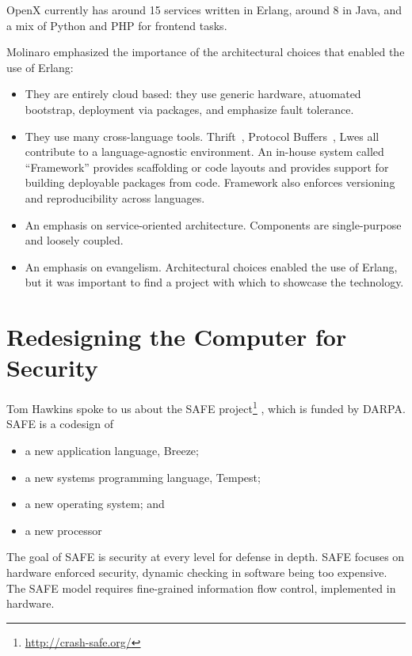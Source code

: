 \documentclass{jfp1}
\begin{document}
OpenX currently has around 15 services written in Erlang, around 8 in
Java, and a mix of Python and PHP for frontend tasks.

Molinaro emphasized the importance of the architectural choices that
enabled the use of Erlang:

\begin{itemize}

\item They are entirely cloud based: they use generic hardware,
atuomated bootstrap, deployment via packages, and emphasize fault
tolerance.

\item They use many cross-language tools. Thrift~\cite{Slee:Thrift},
Protocol Buffers~\cite{Google:2014:Protobufs}, Lwes all
contribute to a language-agnostic environment. An in-house system
called ``Framework'' provides scaffolding or code layouts and provides
support for building deployable packages from code. Framework also
enforces versioning and reproducibility across languages.

\item An emphasis on service-oriented architecture. Components are
single-purpose and loosely coupled.

\item An emphasis on evangelism. Architectural choices enabled the use
of Erlang, but it was important to find a project with which to
showcase the technology.

\end{itemize}

\section{Redesigning the Computer for Security}


Tom Hawkins spoke to us about the SAFE
project\footnote{\url{http://crash-safe.org/}} , which is funded by
DARPA. SAFE is a codesign of

\begin{itemize}
\item a new application language, Breeze;
\item a new systems programming language, Tempest;
\item a new operating system; and
\item a new processor 
\end{itemize}

The goal of SAFE is security at every level for defense in depth.
SAFE focuses on hardware enforced security, dynamic checking
in software being too expensive. The SAFE model requires fine-grained
information flow control, implemented in hardware.
\end{document}
